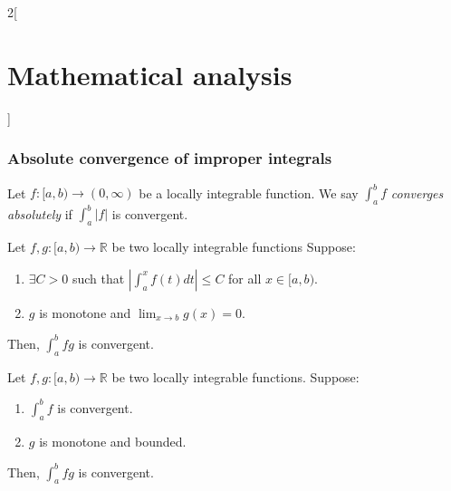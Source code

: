 \documentclass[../../../main.tex]{subfiles}
\begin{document}
\begin{multicols}{2}[\section{Mathematical analysis}]
\subsubsection*{Absolute convergence of improper integrals}
\begin{definition}
Let $f:[a,b)\rightarrow(0,\infty)$ be a locally integrable function. We say $\displaystyle\int_a^b f$ \textit{converges absolutely} if  $\displaystyle\int_a^b |f|$ is convergent.
\end{definition}
\begin{theorem}
Let $f,g:[a,b)\rightarrow\mathbb{R}$ be two locally integrable functions Suppose:
\begin{enumerate}
    \item $\displaystyle\exists C>0$ such that $\left|\int_a^xf(t)dt\right|\leq C$ for all $x\in[a,b)$.
    \item $g$ is monotone and $\displaystyle\lim_{x\to b}g(x)=0$.
\end{enumerate}
Then, $\displaystyle\int_a^b fg$ is convergent.
\end{theorem}
\begin{theorem}
Let $f,g:[a,b)\rightarrow\mathbb{R}$ be two locally integrable functions. Suppose:
\begin{enumerate}
    \item $\displaystyle\int_a^b f$ is convergent.
    \item $g$ is monotone and bounded.
\end{enumerate}
Then, $\displaystyle\int_a^b fg$ is convergent.
\end{theorem}

\end{multicols}
\end{document}
